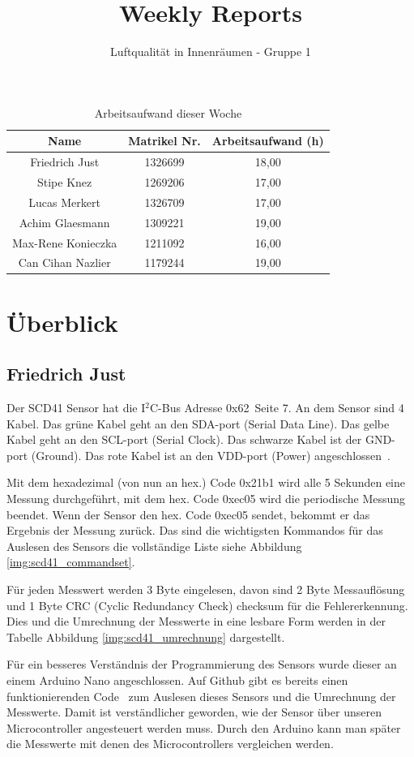 \documentclass[]{article}
\title{Weekly Reports}
\author{Luftqualität in Innenräumen - Gruppe 1}
\begin{document}
\maketitle

\begin{table}[h!]
	\centering
	\begin{tabular}{|c|c|c|}
		\hline
		{\textbf{Name}}				&		{\textbf{Matrikel Nr.}} & {\textbf{Arbeitsaufwand (h)}} \\
		\hline
		Friedrich Just				&		1326699 				&	18,00	\\
		\hline
		Stipe Knez				&		1269206 				&	17,00	\\
		\hline
		Lucas Merkert				&		1326709					&	17,00	\\
		\hline
		Achim Glaesmann				&		1309221					&	19,00	\\
		\hline
		Max-Rene Konieczka			&		1211092					&	16,00	\\
		\hline
		Can Cihan Nazlier			&		1179244					&	19,00	\\
		\hline
	\end{tabular}
	\caption{Arbeitsaufwand dieser Woche}
	\label{tab:worakload}
\end{table}



\section{Überblick}


\subsection{Friedrich Just}
Der SCD41 Sensor hat die I$^2$C-Bus Adresse 0x62~\cite{datasheetscd41}Seite 7. An dem Sensor sind 4 Kabel. Das grüne Kabel geht an den SDA-port (Serial Data Line). Das gelbe Kabel geht an den SCL-port (Serial Clock). Das schwarze Kabel ist der GND-port (Ground). Das rote Kabel ist an den VDD-port (Power) angeschlossen~\cite{sht21cableconf}.\par Mit dem hexadezimal (von nun an hex.) Code 0x21b1 wird alle 5 Sekunden eine Messung durchgeführt, mit dem hex. Code 0xec05 wird die periodische Messung beendet. Wenn der Sensor den hex. Code 0xec05 sendet, bekommt er das Ergebnis der Messung zurück. Das sind die wichtigsten Kommandos für das Auslesen des Sensors die vollständige Liste siehe {Abbildung \ref{img:scd41_commandset}}.\par Für jeden Messwert werden 3 Byte eingelesen, davon sind 2 Byte Messauflösung und 1 Byte CRC (Cyclic Redundancy Check) checksum für die Fehlererkennung. Dies und die Umrechnung der Messwerte in eine lesbare Form werden in der Tabelle {Abbildung \ref{img:scd41_umrechnung}} dargestellt.\par Für ein besseres Verständnis der Programmierung des Sensors wurde dieser an einem Arduino Nano angeschlossen. Auf Github gibt es bereits einen funktionierenden Code~\cite{scd41github} zum Auslesen dieses Sensors und die Umrechnung der Messwerte. Damit ist verständlicher geworden, wie der Sensor über unseren Microcontroller angesteuert werden muss. Durch den Arduino kann man später die Messwerte mit denen des Microcontrollers vergleichen werden.
\end{document}
